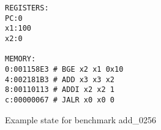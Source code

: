 \begin{figure}
    \centering
    \begin{verbatim}
REGISTERS:
PC:0
x1:100
x2:0

MEMORY:
0:001158E3 # BGE x2 x1 0x10
4:002181B3 # ADD x3 x3 x2
8:00110113 # ADDI x2 x2 1
c:00000067 # JALR x0 x0 0
    \end{verbatim}
    \caption[Example benchmark state]{Example state for benchmark
        add\_0256}\label{fig:bench_example}
\end{figure}